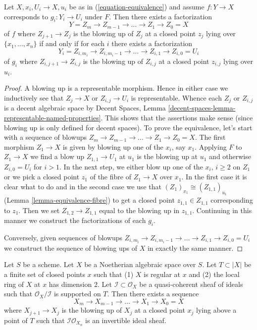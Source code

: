 \begin{lemma}
\label{lemma-equivalence-sequence-blowups}
Let $X, x_i, U_i \to X, u_i$ be as in (\ref{equation-equivalence})
and assume $f : Y \to X$ corresponds to $g_i : Y_i \to U_i$ under $F$.
Then there exists a factorization
$$
Y = Z_m \to Z_{m - 1} \to \ldots \to Z_1 \to Z_0 = X
$$
of $f$ where $Z_{j + 1} \to Z_j$ is the blowing up of $Z_j$ at a closed
point $z_j$ lying over $\{x_1, \ldots, x_n\}$ if and only if for each
$i$ there exists a factorization
$$
Y_i = Z_{i, m_i} \to Z_{i, m_i - 1} \to \ldots \to Z_{i, 1} \to Z_{i, 0} = U_i
$$
of $g_i$ where $Z_{i, j + 1} \to Z_{i, j}$ is the blowing up of $Z_{i, j}$
at a closed point $z_{i, j}$ lying over $u_i$.
\end{lemma}

\begin{proof}
A blowing up is a representable morphism. Hence in either case
we inductively see that $Z_j \to X$ or $Z_{i, j} \to U_i$ is
representable. Whence each $Z_j$ or $Z_{i, j}$ is a decent
algebraic space by Decent Spaces, Lemma
\ref{decent-spaces-lemma-representable-named-properties}.
This shows that the assertions make sense (since blowing up
is only defined for decent spaces).
To prove the equivalence, let's start with a sequence of blowups
$Z_m \to Z_{m - 1} \to \ldots \to Z_1 \to Z_0 = X$.
The first morphism $Z_1 \to X$ is given
by blowing up one of the $x_i$, say $x_1$. Applying $F$
to $Z_1 \to X$ we find a blow up $Z_{1, 1} \to U_1$ at $u_1$
is the blowing up at $u_1$ and otherwise $Z_{i, 0} = U_i$ for $i > 1$.
In the next step, we either blow up one of the $x_i$, $i \geq 2$
on $Z_1$ or we pick a closed point $z_1$ of the fibre of $Z_1 \to X$
over $x_1$. In the first case it is clear what to do and in
the second case we use that $(Z_1)_{x_1} \cong (Z_{1, 1})_{u_1}$
(Lemma \ref{lemma-equivalence-fibre})
to get a closed point $z_{1, 1} \in Z_{1, 1}$ corresponding to $z_1$.
Then we set $Z_{1, 2} \to Z_{1, 1}$ equal to the blowing up
in $z_{1, 1}$. Continuing in this manner we construct the factorizations
of each $g_i$.

\medskip\noindent
Conversely, given sequences of blowups
$Z_{i, m_i} \to Z_{i, m_i - 1} \to \ldots \to Z_{i, 1} \to Z_{i, 0} = U_i$
we construct the sequence of blowing ups of $X$ in exactly the same manner.
\end{proof}

\begin{lemma}
\label{lemma-make-ideal-principal}
Let $S$ be a scheme. Let $X$ be a Noetherian algebraic space over $S$.
Let $T \subset |X|$ be a finite set of closed points $x$ such that
(1) $X$ is regular at $x$ and (2) the local ring of $X$ at $x$ has
dimension $2$. Let $\mathcal{I} \subset \mathcal{O}_X$ be a quasi-coherent
sheaf of ideals such that $\mathcal{O}_X/\mathcal{I}$ is supported on $T$.
Then there exists a sequence
$$
X_m \to X_{m - 1} \to \ldots \to X_1 \to X_0 = X
$$
where $X_{j + 1} \to X_j$ is the blowing up of $X_j$ at a closed
point $x_j$ lying above a point of $T$ such that
$\mathcal{I}\mathcal{O}_{X_n}$ is an invertible ideal sheaf.
\end{lemma}

